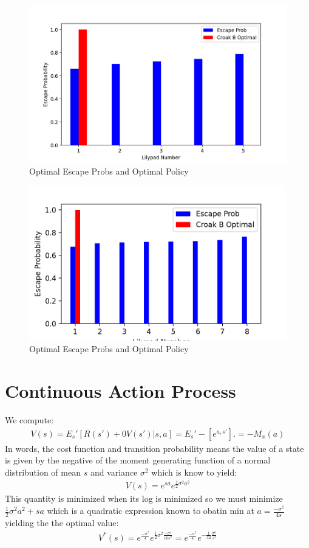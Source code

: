 \documentclass{article}[12pt]
\begin{document}
\begin{figure}
  \includegraphics[width=\linewidth]{llp_6.png}
  \caption{Optimal Escape Probs and Optimal Policy}
  \label{fig:llp6}
\end{figure}

\begin{figure}
  \includegraphics[width=\linewidth]{llp_8.png}
  \caption{Optimal Escape Probs and Optimal Policy}
  \label{fig:llp9}
\end{figure}

\section{Continuous Action Process}

We compute:
\begin{align*}
V(s) = E_s'[R(s') + 0V(s') | s,a] = E_s'-[e^{a,s'}]. = -M_x(a)
\end{align*}
In words, the cost function and transition probability means the value of a state is given by the negative of the moment generating function of a normal distribution of mean $s$ and variance $\sigma^2$ which is know to yield:
\begin{align*}
V(s) = e^{sa}e^{\frac{1}{2}\sigma^2 a^2}
\end{align*}
This quantity is minimized when its log is minimized so we must minimize $\frac{1}{2}\sigma^2a^2 + sa$ which is a quadratic expression known to obatin min at $a = \frac{-\sigma^2}{4s}$ yielding the the optimal value:
\begin{align*}
V^*(s) = e^{\frac{-\sigma^2}{4}}e^{\frac{1}{2}\sigma^2 \frac{-\sigma^4}{16s^2}} =  e^{\frac{-\sigma^2}{4}}e^{-\frac{1}{32} \frac{\sigma^6}{s^2}}
\end{align*}
\end{document}
